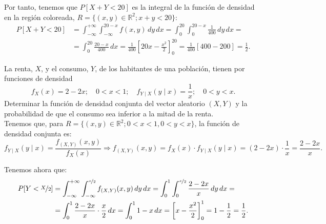 \begin{ejercicio}
\begin{figure}[H]
    \end{figure}

    Por tanto, tenemos que $P[X+Y < 20]$ es la integral de la función de densidad en la región coloreada, $R=\{(x,y)\in \mathbb{R}^2; x+y<20\}$:
    \begin{align*}
        P[X+Y < 20] &= \int_{-\infty}^{+\infty} \int_{-\infty}^{20-x} f(x, y) \, dy \, dx = \int_{0}^{20} \int_{0}^{20-x} \frac{1}{400} \, dy \, dx =\\&= \int_{0}^{20} \frac{20-x}{400} \, dx = \frac{1}{400}\left[20x-\frac{x^2}{2}\right]_0^{20} = \frac{1}{400}\left[400-200\right] = \frac{1}{2}.
    \end{align*}
\end{ejercicio}

\begin{ejercicio}
    La renta, $X$, y el consumo, $Y$, de los habitantes de una población, tienen por funciones de densidad
    \[
        f_X(x) = 2-2x; \quad 0 < x < 1; \quad f_{Y\mid X} (y\mid x) = \frac{1}{x}; \quad 0 < y < x.
    \]
    Determinar la función de densidad conjunta del vector aleatorio $(X,Y)$ y la probabilidad de que el consumo sea inferior a la mitad de la renta.\\

    Tenemos que, para $R=\{(x,y)\in \mathbb{R}^2; 0<x<1, 0<y<x\}$, la función de densidad conjunta es:
    \begin{equation*}
        f_{Y\mid X} (y\mid x) = \dfrac{f_{(X,Y)}(x, y)}{f_X(x)} \Longrightarrow f_{(X,Y)}(x, y) = f_X(x) \cdot f_{Y\mid X} (y\mid x) = (2-2x) \cdot \dfrac{1}{x} = \dfrac{2-2x}{x}.
    \end{equation*}

    Tenemos ahora que:
    \begin{align*}
        P[Y < \nicefrac{X}{2}] &= \int_{-\infty}^{+\infty} \int_{-\infty}^{\nicefrac{x}{2}} f_{(X,Y)}(x, y) \, dy \, dx = \int_{0}^{1} \int_{0}^{\nicefrac{x}{2}} \dfrac{2-2x}{x} \, dy \, dx =\\&= \int_{0}^{1} \dfrac{2-2x}{x}\cdot \dfrac{x}{2} \, dx = \int_{0}^{1} 1-x \, dx = \left[x-\dfrac{x^2}{2}\right]_0^1 = 1-\dfrac{1}{2} = \dfrac{1}{2}.
    \end{align*}

    
\end{ejercicio}

